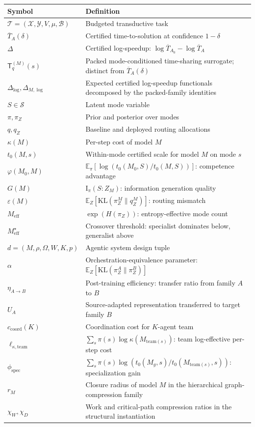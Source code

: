 \documentclass[10pt]{article}
\theoremstyle{paperplain}
\theoremstyle{paperdefinition}
\theoremstyle{paperremark}
\newcommand{\KL}{\mathrm{KL}}
\newcommand{\I}{\mathrm{I}}
\newcommand{\E}{\mathbb{E}}
\newcommand{\cX}{\mathcal{X}}
\newcommand{\cY}{\mathcal{Y}}
\newcommand{\cS}{\mathcal{S}}
\newcommand{\cT}{\mathcal{T}}
\newcommand{\cB}{\mathcal{B}}
\newcommand{\Meff}{M_{\mathrm{eff}}}
\newcommand{\Dlog}{\Delta_{\log}}
\newcommand{\DlogM}{\Delta_{M,\log}}
\begin{document}
\begin{center}
\small
\renewcommand{\arraystretch}{1.2}
\begin{tabular}{@{}lp{9cm}@{}}
\toprule
\textbf{Symbol} & \textbf{Definition} \\
\midrule
$\cT = (\cX, \cY, V, \mu, \cB)$ & Budgeted transductive task \\
$\overline{T}_A(\delta)$ & Certified time-to-solution at confidence $1-\delta$ \\
$\Delta$ & Certified log-speedup: $\log \overline{T}_{A_0} - \log \overline{T}_A$ \\
$\mathsf{T}_q^{(M)}(s)$ & Packed mode-conditioned time-sharing surrogate; distinct from $\overline T_A(\delta)$ \\
$\Dlog,\DlogM$ & Expected certified log-speedup functionals decomposed by the packed-family identities \\
$S \in \cS$ & Latent mode variable \\
$\pi, \pi_Z$ & Prior and posterior over modes \\
$q, q_Z$ & Baseline and deployed routing allocations \\
$\kappa(M)$ & Per-step cost of model $M$ \\
$t_0(M,s)$ & Within-mode certified scale for model $M$ on mode $s$ \\
$\varphi(M_0,M)$ & $\E_\pi[\log(t_0(M_0,S)/t_0(M,S))]$: competence advantage \\
$G(M)$ & $\I_\pi(S : Z_M)$: information generation quality \\
$\varepsilon(M)$ & $\E_Z[\KL(\pi_Z^M \| q_Z^M)]$: routing mismatch \\
$\Meff$ & $\exp(H(\pi_Z))$: entropy-effective mode count \\
$\Meff^\star$ & Crossover threshold: specialist dominates below, generalist above \\
$d = (M, \rho, \Omega, W, K, p)$ & Agentic system design tuple \\
$\alpha$ & Orchestration-equivalence parameter: $\E_Z[\KL(\pi^A_Z \| \pi^B_Z)]$ \\
$\eta_{A \to B}$ & Post-training efficiency: transfer ratio from family $A$ to $B$ \\
$U_A$ & Source-adapted representation transferred to target family $B$ \\
$c_{\mathrm{coord}}(K)$ & Coordination cost for $K$-agent team \\
$\ell_{\kappa,\mathrm{team}}$ & $\sum_s\pi(s)\log\kappa(M_{\mathrm{team}(s)})$: team log-effective per-step cost \\
$\phi_{\mathrm{spec}}$ & $\sum_s \pi(s)\log(t_0(M_g,s)/t_0(M_{\mathrm{team}(s)},s))$: specialization gain \\
$r_M$ & Closure radius of model $M$ in the hierarchical graph-compression family \\
$\chi_W,\chi_D$ & Work and critical-path compression ratios in the structural instantiation \\
\bottomrule
\end{tabular}
\end{center}
\end{document}

